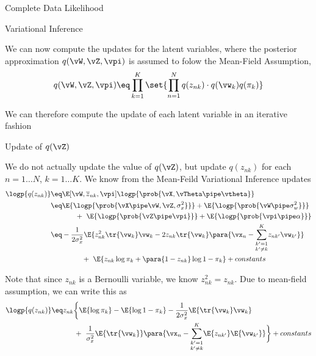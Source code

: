 \documentclass{article}
\begin{document}
\begin{question}
\begin{qsection}{Complete Data Likelihood}
	\end{qsection}

	\begin{qsection}{Variational Inference}

		We can now compute the updates for the latent variables, where the posterior approximation $q(\vW, \vZ, \vpi)$ is assumed to folow the Mean-Field Assumption, \ie
		\begin{align*}
			q(\vW, \vZ, \vpi)	\eq	\prod_{k = 1}^K \set{\prod_{n = 1}^N q(z_{nk}) \cdot q(\vw_k) q(\pi_k)}
		\end{align*}

		We can therefore compute the update of each latent variable in an iterative fashion

		\begin{qsubsection}{\boldmath Update of $q(\vZ)$}

			We do not actually update the value of $q(\vZ)$, but update $q(z_{nk})$ for each $n = 1 \dots N$, $k = 1 \dots K$. We know from the Mean-Feild Variational Inference updates
			\begin{align*}
				\logp{q(z_{nk})}	&\eq	\E[\vW, \overline{z}_{nk}, \vpi]{\logp{\prob{\vX, \vTheta \pipe \vtheta}}} \\
				&\eq	\E{\logp{\prob{\vX \pipe \vW, \vZ, \sigma_x^2}}} + \E{\logp{\prob{\vW \pipe \sigma_w^2}}} \\
				&\hspace{1.2cm} + \ \E{\logp{\prob{\vZ \pipe \vpi}}} + \E{\logp{\prob{\vpi \pipe \alpha}}} \\
				&\eq	- \frac{1}{ 2\sigma_x^2} \E{z_{nk}^2 \tr{\vw_k} \vw_k - 2 z_{nk} \tr{\vw_k} \para{\vx_n - \underset{k' \ne k}{\sum_{k' = 1}^K} z_{nk'} \vw_{k'}}} \\
				&\hspace{1.53cm} + \ \E{z_{nk} \log{\pi_k} + \para{1 - z_{nk}} \log{1 - \pi_k}} + constants
			\end{align*}

			Note that since $z_{nk}$ is a Bernoulli variable, we know $z_{nk}^2 = z_{nk}$. Due to mean-field assumption, we can write this as
			\begin{align*}
				\logp{q(z_{nk})}	&\eq	z_{nk} \bigg\{ \E{\log{\pi_k}} - \E{\log{1 - \pi_k}}  - \frac{1}{2 \sigma_x^2} \E{\tr{\vw_k} \vw_k} \\
				&\hspace{1.1cm} + \ \frac{1}{\sigma_x^2} \E{\tr{\vw_k}} \para{\vx_n - \underset{k' \ne k}{\sum_{k' = 1}^K} \E{z_{nk'}} \E{\vw_{k'}}} \bigg\} + constants
			\end{align*}


\end{qsubsection}
\end{qsection}
\end{question}
\end{document}
